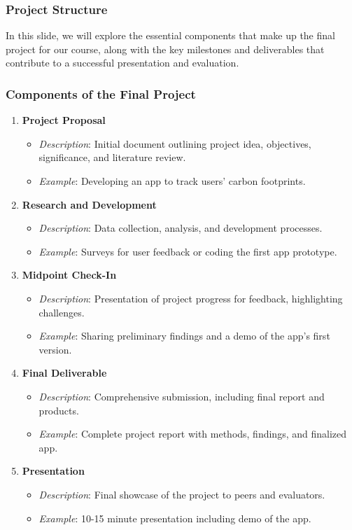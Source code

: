\documentclass[aspectratio=169]{beamer}
\begin{document}
\begin{frame}[fragile]
    \frametitle{Project Structure}
    In this slide, we will explore the essential components that make up the final project for our course,
    along with the key milestones and deliverables that contribute to a successful presentation and evaluation.
\end{frame}

\begin{frame}[fragile]
    \frametitle{Components of the Final Project}
    \begin{enumerate}
        \item \textbf{Project Proposal}
        \begin{itemize}
            \item \textit{Description}: Initial document outlining project idea, objectives, significance, and literature review.
            \item \textit{Example}: Developing an app to track users' carbon footprints.
        \end{itemize}
        
        \item \textbf{Research and Development}
        \begin{itemize}
            \item \textit{Description}: Data collection, analysis, and development processes.
            \item \textit{Example}: Surveys for user feedback or coding the first app prototype.
        \end{itemize}
        
        \item \textbf{Midpoint Check-In}
        \begin{itemize}
            \item \textit{Description}: Presentation of project progress for feedback, highlighting challenges.
            \item \textit{Example}: Sharing preliminary findings and a demo of the app’s first version.
        \end{itemize}
        
        \item \textbf{Final Deliverable}
        \begin{itemize}
            \item \textit{Description}: Comprehensive submission, including final report and products.
            \item \textit{Example}: Complete project report with methods, findings, and finalized app.
        \end{itemize}
        
        \item \textbf{Presentation}
        \begin{itemize}
            \item \textit{Description}: Final showcase of the project to peers and evaluators.
            \item \textit{Example}: 10-15 minute presentation including demo of the app.
        \end{itemize}
    \end{enumerate}
\end{frame}
\end{document}
